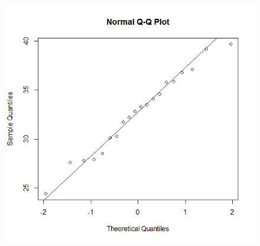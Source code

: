 {\begin{figure}[H]
\begin{minipage}[c]{0.5\textwidth}
  \end{minipage}\hfill
  \begin{minipage}[c]{0.5\textwidth}
    \includegraphics[width=1\linewidth]{images/qqNormLine.png}
  \end{minipage}\\
  \begin{minipage}[t]{.5\textwidth}
  \end{minipage}\hfill
  \begin{minipage}[t]{.5\textwidth}
  \end{minipage}
\end{figure}
\begin{figure}[H]
	  \begin{minipage}[c]{0.5\textwidth}

\end{minipage}
\end{figure}}
